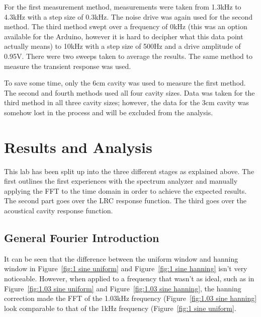 \documentclass[12pt]{article}
\begin{document}
For the first measurement method, measurements were taken from 1.3kHz to 4.3kHz with a step size of 0.3kHz. The noise drive was again used for the second method. The third method swept over a frequency of 0kHz (this was an option available for the Arduino, however it is hard to decipher what this data point actually means) to 10kHz with a step size of 500Hz and a drive amplitude of 0.95V. There were two sweeps taken to average the results. The same method to measure the transient response was used. 

To save some time, only the 6cm cavity was used to measure the first method. The second and fourth methods used all four cavity sizes. Data was taken for the third method in all three cavity sizes; however, the data for the 3cm cavity was somehow lost in the process and will be excluded from the analysis.


\section{Results and Analysis}

This lab has been split up into the three different stages as explained above. The first outlines the first experiences with the spectrum analyzer and manually applying the FFT to the time domain in order to achieve the expected results. The second part goes over the LRC response function. The third goes over the acoustical cavity response function. 

\subsection{General Fourier Introduction}
It can be seen that the difference between the uniform window and hanning window in Figure~\ref{fig:1 sine uniform} and Figure~\ref{fig:1 sine hanning} isn't very noticeable. However, when applied to a frequency that wasn't as ideal, such as in Figure~\ref{fig:1.03 sine uniform} and Figure~\ref{fig:1.03 sine hanning}, the hanning correction made the FFT of the 1.03kHz frequency (Figure~\ref{fig:1.03 sine hanning} look comparable to that of the 1kHz frequency (Figure~\ref{fig:1 sine uniform}. 
\end{document}
